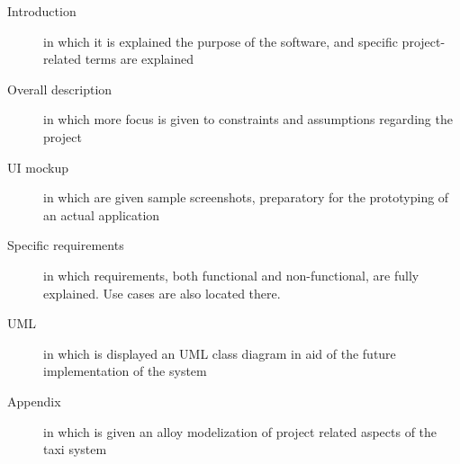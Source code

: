 \begin{description}
 \item [Introduction] in which it is explained the purpose of the software, and specific project-related terms are explained
 \item [Overall description] in which more focus is given to constraints and assumptions regarding the project
 \item [UI mockup] in which are given sample screenshots, preparatory for the prototyping of an actual application 
 \item [Specific requirements] in which requirements, both functional and non-functional, are fully explained.
 Use cases are also located there.
 \item [UML] in which is displayed an UML class diagram in aid of the future implementation of the system
 \item [Appendix] in which is given an alloy modelization of project related aspects of the taxi system
 
\end{description}
